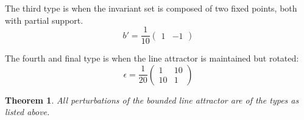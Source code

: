\documentclass{article} %
\newcounter{ct}
\newtheorem{theorem}{Theorem}
\theoremstyle{definition}
\theoremstyle{remark}
\begin{document}
The third type is when the invariant set is composed of two fixed points, both with partial support.
\begin{equation}
b' =  \frac{1}{10}
\begin{pmatrix}
1 & -1
\end{pmatrix}
\end{equation}

The fourth and final type is when the line attractor is maintained but rotated:
\begin{equation}
\epsilon =  \frac{1}{20}
\begin{pmatrix}
1 & 10\\
10 & 1
\end{pmatrix}
\end{equation}

\begin{theorem}
All perturbations of the bounded line attractor are of the types as listed above.
\end{theorem}
\end{document}
